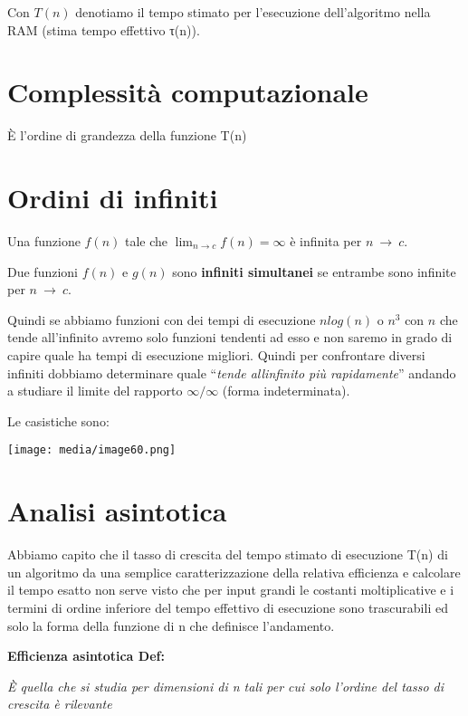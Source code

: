 Con \(T(n)\) denotiamo il tempo stimato per l'esecuzione dell'algoritmo
nella RAM (stima tempo effettivo τ(n)).

\section{\texorpdfstring{Complessità computazionale
}{Complessità computazionale }}\label{complessituxe0-computazionale}

È l'ordine di grandezza della funzione T(n)

\section{Ordini di infiniti}\label{ordini-di-infiniti}

Una funzione \(f(n)\) tale che \(\lim_{n \rightarrow c}f(n) = \infty\) è
infinita per \(n\  \rightarrow \ c\).

Due funzioni \(f(n)\) e \(g(n)\) sono \textbf{infiniti simultanei} se
entrambe sono infinite per \(n\  \rightarrow \ c\).

Quindi se abbiamo funzioni con dei tempi di esecuzione \(nlog(n)\) o
\(n^{3}\) con \(n\) che tende all'infinito avremo solo funzioni tendenti
ad esso e non saremo in grado di capire quale ha tempi di esecuzione
migliori. Quindi per confrontare diversi infiniti dobbiamo determinare
quale ``\emph{tende all\textquotesingle infinito più rapidamente}''
andando a studiare il limite del rapporto \(\infty/\infty\) (forma
indeterminata).

Le casistiche sono:

\texttt{[image: media/image60.png]}

\section{Analisi asintotica}\label{analisi-asintotica}

Abbiamo capito che il tasso di crescita del tempo stimato di esecuzione
T(n) di un algoritmo da una semplice caratterizzazione della relativa
efficienza e calcolare il tempo esatto non serve visto che per input
grandi le costanti moltiplicative e i termini di ordine inferiore del
tempo effettivo di esecuzione sono trascurabili ed solo la forma della
funzione di n che definisce l'andamento.

\textbf{Efficienza asintotica \textbar{} Def:}

\emph{È quella che si studia per dimensioni di n tali per cui solo
l'ordine del tasso di crescita è rilevante}

